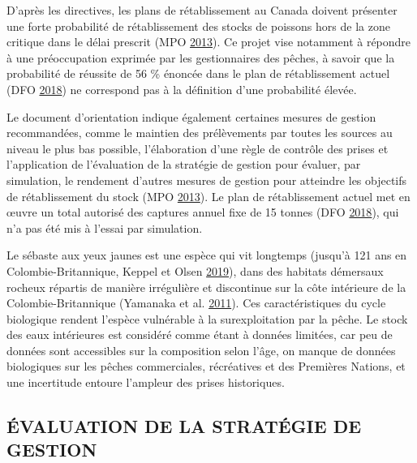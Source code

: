 \documentclass[french,11pt]{book}
\begin{document}
D'après les directives, les plans de rétablissement au Canada doivent présenter une forte probabilité de rétablissement des stocks de poissons hors de la zone critique dans le délai prescrit (MPO \protect\hyperlink{ref-dfo2013}{2013}). Ce projet vise notamment à répondre à une préoccupation exprimée par les gestionnaires des pêches, à savoir que la probabilité de réussite de 56 \% énoncée dans le plan de rétablissement actuel (DFO \protect\hyperlink{ref-ifmp2018}{2018}) ne correspond pas à la définition d'une probabilité élevée.

Le document d'orientation indique également certaines mesures de gestion recommandées, comme le maintien des prélèvements par toutes les sources au niveau le plus bas possible, l'élaboration d'une règle de contrôle des prises et l'application de l'évaluation de la stratégie de gestion pour évaluer, par simulation, le rendement d'autres mesures de gestion pour atteindre les objectifs de rétablissement du stock (MPO \protect\hyperlink{ref-dfo2013}{2013}). Le plan de rétablissement actuel met en œuvre un total autorisé des captures annuel fixe de 15 tonnes (DFO \protect\hyperlink{ref-ifmp2018}{2018}), qui n'a pas été mis à l'essai par simulation.

Le sébaste aux yeux jaunes est une espèce qui vit longtemps (jusqu'à 121 ans en Colombie-Britannique, Keppel et Olsen \protect\hyperlink{ref-keppel2019}{2019}), dans des habitats démersaux rocheux répartis de manière irrégulière et discontinue sur la côte intérieure de la Colombie-Britannique (Yamanaka et al. \protect\hyperlink{ref-yamanaka2011}{2011}). Ces caractéristiques du cycle biologique rendent l'espèce vulnérable à la surexploitation par la pêche. Le stock des eaux intérieures est considéré comme étant à données limitées, car peu de données sont accessibles sur la composition selon l'âge, on manque de données biologiques sur les pêches commerciales, récréatives et des Premières Nations, et une incertitude entoure l'ampleur des prises historiques.

\hypertarget{sec:introduction-mse}{%
\subsection{ÉVALUATION DE LA STRATÉGIE DE GESTION}\label{sec:introduction-mse}}
\end{document}
